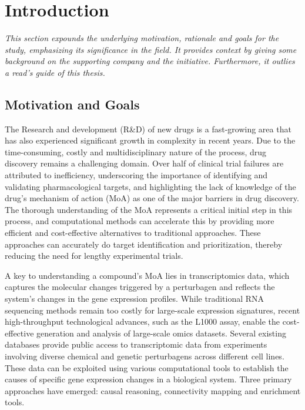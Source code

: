 
%

\makeatletter
\newcommand{\ntifpkgloaded}{%
  \@ifpackageloaded%
}
\makeatother

\chapter{Introduction}
\label{cha:introduction}

\textit{This section expounds the underlying motivation, rationale and goals for the study, emphasizing its significance in the field. It provides context by giving some background on the supporting company and the initiative. Furthermore, it outlies a read’s guide of this thesis.}

\section{Motivation and Goals} %
\label{sec:motivation_and_goals}


The Research and development (R\&D) of new drugs is a fast-growing area that has also experienced significant growth in complexity in recent years. Due to the time-consuming, costly and multidisciplinary nature of the process, drug discovery remains a challenging domain. Over half of clinical trial failures are attributed to inefficiency, underscoring the importance of identifying and validating pharmacological targets, and highlighting the lack of knowledge of the drug’s mechanism of action (MoA) as one of the major barriers in drug discovery. The thorough understanding of the MoA represents a critical initial step in this process, and computational methods can accelerate this by providing more efficient and cost-effective alternatives to traditional approaches. These approaches can accurately do target identification and prioritization, thereby reducing the need for lengthy experimental trials.

A key to understanding a compound’s MoA lies in transcriptomics data, which captures the molecular changes triggered by a perturbagen and reflects the system’s changes in the gene expression profiles. While traditional RNA sequencing methods remain too costly for large-scale expression signatures, recent high-throughput technological advances, such as the L1000 assay, enable the cost-effective generation and analysis of large-scale omics datasets. Several existing databases provide public access to transcriptomic data from experiments involving diverse chemical and genetic perturbagens across different cell lines. These data can be exploited using various computational tools to establish the causes of specific gene expression changes in a biological system. Three primary approaches have emerged: causal reasoning, connectivity mapping and enrichment tools.

